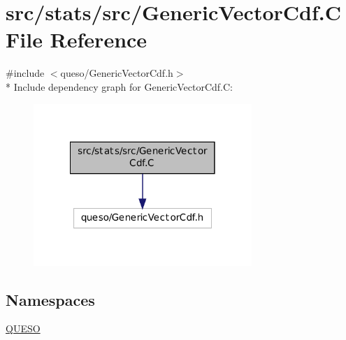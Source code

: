 \hypertarget{_generic_vector_cdf_8_c}{\section{src/stats/src/\-Generic\-Vector\-Cdf.C File Reference}
\label{_generic_vector_cdf_8_c}
}
{\ttfamily \#include $<$queso/\-Generic\-Vector\-Cdf.\-h$>$}\\*
Include dependency graph for Generic\-Vector\-Cdf.\-C\-:
\nopagebreak
\begin{figure}[H]
\begin{center}
\leavevmode
\includegraphics[width=234pt]{_generic_vector_cdf_8_c__incl}
\end{center}
\end{figure}
\subsection*{Namespaces}
\begin{DoxyCompactItemize}
\item 
\hyperlink{namespace_q_u_e_s_o}{Q\-U\-E\-S\-O}
\end{DoxyCompactItemize}
